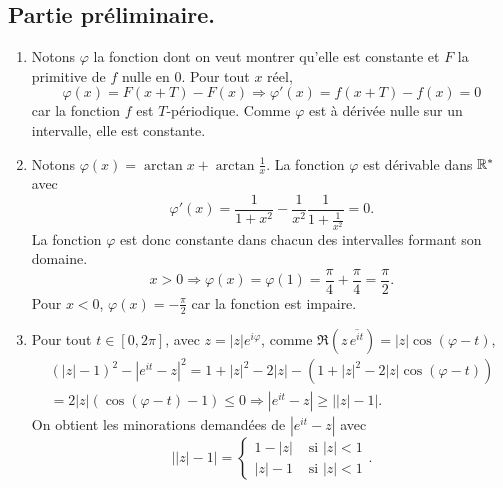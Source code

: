 \subsection*{Partie préliminaire.}
\begin{enumerate}
 \item Notons $\varphi$ la fonction dont on veut montrer qu'elle est constante et $F$ la primitive de $f$ nulle en $0$. Pour tout $x$ réel,
\[
 \varphi(x) = F(x+T) - F(x) \Rightarrow \varphi'(x) = f(x+T) - f(x) = 0
\]
car la fonction $f$ est $T$-périodique. Comme $\varphi$ est à dérivée nulle sur un intervalle, elle est constante.

 \item Notons $\varphi(x) = \arctan x + \arctan \frac{1}{x}$. La fonction $\varphi$ est dérivable dans $\mathbb{R}^*$ avec 
\[
 \varphi'(x) = \frac{1}{1+x^2} - \frac{1}{x^2}\frac{1}{1+\frac{1}{x^2}} = 0.
\]
La fonction $\varphi$ est donc constante dans chacun des intervalles formant son domaine.
\[
 x>0 \Rightarrow \varphi(x) = \varphi(1) = \frac{\pi}{4} + \frac{\pi}{4} = \frac{\pi}{2}. 
\]
Pour $x<0$, $\varphi(x) = - \frac{\pi}{2}$ car la fonction est impaire.

 \item Pour tout $t\in [0, 2\pi]$, avec $z=|z|e^{i\varphi}$, comme $\Re\left( z\,\overline{e^{it}}\right) = |z|\cos(\varphi -t)$, 
\begin{multline*}
 (|z|-1)^2 - |e^{it} - z|^2 = 1 + |z|^2 -2|z| - \left( 1 + |z|^2 - 2|z|\cos(\varphi - t)\right) \\
 = 2|z|\left( \cos(\varphi - t) - 1\right) \leq 0 
 \Rightarrow |e^{it} - z| \geq \left||z| - 1\right|. 
\end{multline*}
On obtient les minorations demandées de $|e^{it} - z|$ avec
\[
 \left||z| - 1\right|
= 
\left\lbrace 
\begin{aligned}
 1 - |z| &\text{ si } |z| < 1 \\
 |z| - 1 &\text{ si } |z| < 1
\end{aligned}
\right. .
\]

\end{enumerate}

